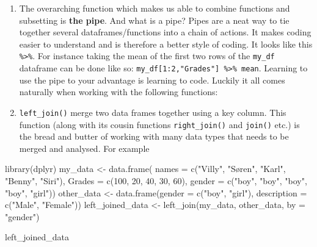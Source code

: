 \documentclass[
]{book}
\newenvironment{Shaded}{\begin{snugshade}}{\end{snugshade}}
\newcommand{\AttributeTok}[1]{\textcolor[rgb]{0.77,0.63,0.00}{#1}}
\newcommand{\DecValTok}[1]{\textcolor[rgb]{0.00,0.00,0.81}{#1}}
\newcommand{\FunctionTok}[1]{\textcolor[rgb]{0.00,0.00,0.00}{#1}}
\newcommand{\NormalTok}[1]{#1}
\newcommand{\OtherTok}[1]{\textcolor[rgb]{0.56,0.35,0.01}{#1}}
\newcommand{\StringTok}[1]{\textcolor[rgb]{0.31,0.60,0.02}{#1}}
\begin{document}
\begin{enumerate}
\def\labelenumi{\arabic{enumi}.}
\item
  The overarching function which makes us able to combine functions and
  subsetting is \textbf{the pipe}. And what is a pipe? Pipes are a neat
  way to tie together several dataframes/functions into a chain of
  actions. It makes coding easier to understand and is therefore a
  better style of coding. It looks like this
  \texttt{\%\textgreater{}\%}. For instance taking the mean of the first
  two rows of the \texttt{my\_df} dataframe can be done like so:
  \texttt{my\_df{[}1:2,"Grades"{]}\ \%\textgreater{}\%\ mean}. Learning
  to use the pipe to your advantage is learning to code. Luckily it all
  comes naturally when working with the following functions:
\item
  \texttt{left\_join()} merge two data frames together using a key
  column. This function (along with its cousin functions
  \texttt{right\_join()} and \texttt{join()} etc.) is the bread and
  butter of working with many data types that needs to be merged and
  analysed. For example
\end{enumerate}

\begin{Shaded}
\begin{Highlighting}[]
  \FunctionTok{library}\NormalTok{(dplyr) }
\NormalTok{  my\_data }\OtherTok{\textless{}{-}} \FunctionTok{data.frame}\NormalTok{(}
  \AttributeTok{names =} \FunctionTok{c}\NormalTok{(}\StringTok{"Villy"}\NormalTok{, }\StringTok{"Søren"}\NormalTok{, }\StringTok{"Karl"}\NormalTok{, }\StringTok{"Benny"}\NormalTok{, }\StringTok{"Siri"}\NormalTok{),}
  \AttributeTok{Grades =} \FunctionTok{c}\NormalTok{(}\DecValTok{100}\NormalTok{, }\DecValTok{20}\NormalTok{, }\DecValTok{40}\NormalTok{, }\DecValTok{30}\NormalTok{, }\DecValTok{60}\NormalTok{),}
  \AttributeTok{gender =} \FunctionTok{c}\NormalTok{(}\StringTok{"boy"}\NormalTok{, }\StringTok{"boy"}\NormalTok{, }\StringTok{"boy"}\NormalTok{, }\StringTok{"boy"}\NormalTok{, }\StringTok{"girl"}\NormalTok{)) }
\NormalTok{  other\_data }\OtherTok{\textless{}{-}} \FunctionTok{data.frame}\NormalTok{(}\AttributeTok{gender =} \FunctionTok{c}\NormalTok{(}\StringTok{"boy"}\NormalTok{, }\StringTok{"girl"}\NormalTok{), }\AttributeTok{description =} \FunctionTok{c}\NormalTok{(}\StringTok{"Male"}\NormalTok{, }\StringTok{"Female"}\NormalTok{))}
\NormalTok{  left\_joined\_data }\OtherTok{\textless{}{-}} \FunctionTok{left\_join}\NormalTok{(my\_data, other\_data, }\AttributeTok{by =} \StringTok{"gender"}\NormalTok{) }
  
\NormalTok{  left\_joined\_data}
\end{Highlighting}
\end{Shaded}
\end{document}
